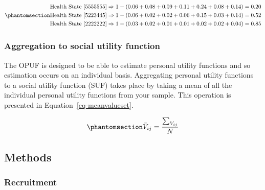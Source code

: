 \documentclass[
  letterpaper,
  DIV=11,
  numbers=noendperiod]{scrartcl}
\begin{document}
\begin{equation}\phantomsection\label{eq-HS123}{
\begin{aligned}
\text{Health State [5555555]} & \Rightarrow 1 - (0.06 + 0.08 + 0.09 + 0.11 + 0.24 + 0.08 + 0.14) = 0.20 \\
\text{Health State [5223445]} & \Rightarrow 1 - (0.06 + 0.02 + 0.02 + 0.06 + 0.15 + 0.03 + 0.14) = 0.52 \\
\text{Health State [2222222]} & \Rightarrow 1 - (0.03 + 0.02 + 0.01 + 0.01 + 0.02 + 0.02 + 0.04) = 0.85
\end{aligned}
}\end{equation}

\subsubsection{Aggregation to social utility
function}\label{aggregation-to-social-utility-function}

The OPUF is designed to be able to estimate personal utility functions
and so estimation occurs on an individual basis. Aggregating personal
utility functions to a social utility function (SUF) takes place by
taking a mean of all the individual personal utility functions from your
sample. This operation is presented in Equation~\ref{eq-meanvalueset}.

\begin{equation}\phantomsection\label{eq-meanvalueset}{
\bar{V}_{{ij}} = \frac{\sum_{V_{{ij}}}^{}}{N}
}\end{equation}

\subsection{Methods}\label{methods}

\subsubsection{Recruitment}\label{recruitment}
\end{document}
